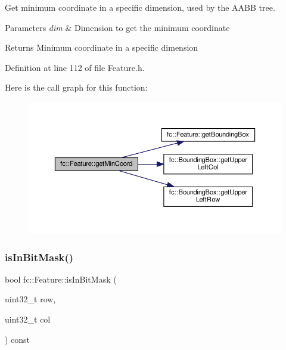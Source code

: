 Get minimum coordinate in a specific dimension, used by the A\+A\+BB tree. 


\begin{DoxyParams}{Parameters}
{\em dim} & Dimension to get the minimum coordinate \\
\hline
\end{DoxyParams}
\begin{DoxyReturn}{Returns}
Minimum coordinate in a specific dimension 
\end{DoxyReturn}


Definition at line 112 of file Feature.\+h.

Here is the call graph for this function\+:
\nopagebreak
\begin{figure}[H]
\begin{center}
\leavevmode
\includegraphics[width=350pt]{d7/d71/classfc_1_1Feature_a034cb38f61076e527f4f16eecb97c0b4_cgraph}
\end{center}
\end{figure}
\mbox{\label{classfc_1_1Feature_a8cd5e2721373377bb80d87dd72265f98}} 
\subsubsection{\texorpdfstring{is\+In\+Bit\+Mask()}{isInBitMask()}}
{\footnotesize\ttfamily bool fc\+::\+Feature\+::is\+In\+Bit\+Mask (\begin{DoxyParamCaption}\item[{uint32\+\_\+t}]{row,  }\item[{uint32\+\_\+t}]{col }\end{DoxyParamCaption}) const\hspace{0.3cm}{\ttfamily [inline]}}



